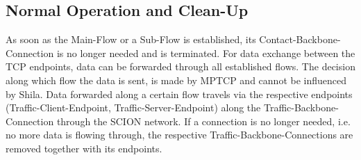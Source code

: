 \subsection*{Normal Operation and Clean-Up}
\label{subsec:ShilaCleanUp}

As soon as the Main-Flow or a Sub-Flow is established, its Contact-Backbone-Connection is no longer needed and is terminated. For data exchange between the TCP endpoints, data can be forwarded through all established flows. The decision along which flow the data is sent, is made by MPTCP and cannot be influenced by Shila. Data forwarded along a certain flow travels via the respective endpoints (Traffic-Client-Endpoint, Traffic-Server-Endpoint) along the Traffic-Backbone-Connection through the SCION network.  If a connection is no longer needed, i.e. no more data is flowing through, the respective Traffic-Backbone-Connections are removed together with its endpoints.

